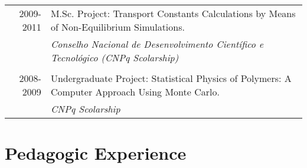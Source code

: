 \documentclass[a4paper,10pt]{article} %
\begin{document}
\begin{tabular}{r|p{12cm}}	
\textsc{2009-2011} & M.Sc. Project: Transport Constants Calculations by Means of Non-Equilibrium Simulations. \\
& \emph{Conselho Nacional de Desenvolvimento Cient\'ifico e Tecnol\'ogico (CNPq Scolarship)}\\
&\\


\textsc{2008-2009} & Undergraduate Project: Statistical Physics of Polymers: A Computer Approach Using Monte Carlo.\\
& \emph{CNPq Scolarship}
\end{tabular}


\section{Pedagogic Experience}
\end{document}
